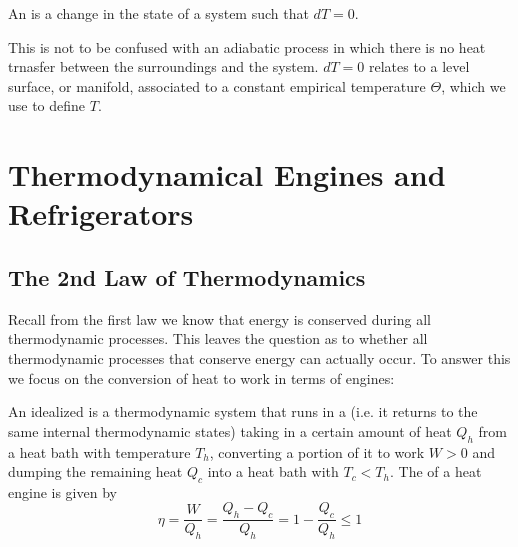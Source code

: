 \documentclass[12pt, a4paper, oneside, openright, titlepage]{book}
\begin{document}
\begin{defn}
    An  is a change in the state of a system such that $dT = 0$.
\end{defn}

This is not to be confused with an adiabatic process in which there is no heat trnasfer between the surroundings and the system. $dT = 0$ relates to a level surface, or manifold, associated to a constant empirical temperature $\Theta$, which we use to define $T$.


\chapter{Thermodynamical Engines and Refrigerators}


\section{The 2nd Law of Thermodynamics}

Recall from the first law we know that energy is conserved during all thermodynamic processes. This leaves the question as to whether all thermodynamic processes that conserve energy can actually occur. To answer this we focus on the conversion of heat to work in terms of engines:

\begin{defn}
    An idealized  is a thermodynamic system that runs in a  (i.e. it returns to the same internal thermodynamic states) taking in a certain amount of heat $Q_h$ from a heat bath with temperature $T_h$, converting a portion of it to work $W > 0$ and dumping the remaining heat $Q_c$ into a heat bath with $T_c < T_h$. The  of a heat engine is given by \begin{equation}
        \eta = \frac{W}{Q_h} = \frac{Q_h-Q_c}{Q_h} = 1 - \frac{Q_c}{Q_h} \leq 1
    \end{equation}
\end{defn}
\end{document}
